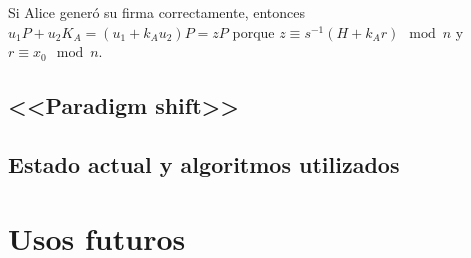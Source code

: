 \documentclass[
  a4paper,
  12pt,
  spanish,
]{scrartcl}
\begin{document}
Si Alice generó su firma correctamente, entonces $u_1P+u_2K_A=(u_1+k_Au_2)P=zP$ porque $z \equiv s^{-1}(H+k_Ar) \mod n$ y $r \equiv x_0 \mod n$.





\subsection{<<Paradigm shift>>}



\subsection{Estado actual y algoritmos utilizados}


\section{Usos futuros}




\newpage
\printbibliography
\end{document}
